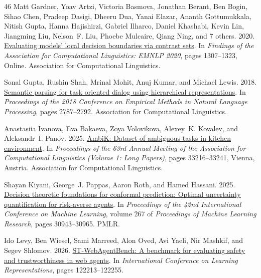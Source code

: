 \documentclass[11pt]{article}
\begin{document}
\begin{thebibliography}{46}
Matt Gardner, Yoav Artzi, Victoria Basmova, Jonathan Berant, Ben Bogin, Sihao Chen, Pradeep Dasigi, Dheeru Dua, Yanai Elazar, Ananth Gottumukkala, Nitish Gupta, Hanna Hajishirzi, Gabriel Ilharco, Daniel Khashabi, Kevin Lin, Jiangming Liu, Nelson~F. Liu, Phoebe Mulcaire, Qiang Ning, and 7 others. 2020.
\newblock \href {https://doi.org/10.18653/v1/2020.findings-emnlp.117} {Evaluating models' local decision boundaries via contrast sets}.
\newblock In \emph{Findings of the Association for Computational Linguistics: EMNLP 2020}, pages 1307--1323, Online. Association for Computational Linguistics.

Sonal Gupta, Rushin Shah, Mrinal Mohit, Anuj Kumar, and Michael Lewis. 2018.
\newblock \href {https://doi.org/10.18653/v1/D18-1300} {Semantic parsing for task oriented dialog using hierarchical representations}.
\newblock In \emph{Proceedings of the 2018 Conference on Empirical Methods in Natural Language Processing}, pages 2787--2792. Association for Computational Linguistics.

Anastasiia Ivanova, Eva Bakaeva, Zoya Volovikova, Alexey~K. Kovalev, and Aleksandr~I. Panov. 2025.
\newblock \href {https://doi.org/10.18653/v1/2025.acl-long.1593} {{A}mbi{K}: Dataset of ambiguous tasks in kitchen environment}.
\newblock In \emph{Proceedings of the 63rd Annual Meeting of the Association for Computational Linguistics (Volume 1: Long Papers)}, pages 33216--33241, Vienna, Austria. Association for Computational Linguistics.

Shayan Kiyani, George~J. Pappas, Aaron Roth, and Hamed Hassani. 2025.
\newblock \href {https://proceedings.mlr.press/v267/kiyani25a.html} {Decision theoretic foundations for conformal prediction: Optimal uncertainty quantification for risk-averse agents}.
\newblock In \emph{Proceedings of the 42nd International Conference on Machine Learning}, volume 267 of \emph{Proceedings of Machine Learning Research}, pages 30943--30965. PMLR.

Ido Levy, Ben Wiesel, Sami Marreed, Alon Oved, Avi Yaeli, Nir Mashkif, and Segev Shlomov. 2026.
\newblock \href {https://proceedings.iclr.cc/paper_files/paper/2026/hash/c6c29e590e3c62e37e6b39cdd6baf2e8-Abstract-Conference.html} {{ST-WebAgentBench}: A benchmark for evaluating safety and trustworthiness in web agents}.
\newblock In \emph{International Conference on Learning Representations}, pages 122213--122255.


\end{thebibliography}
\end{document}
